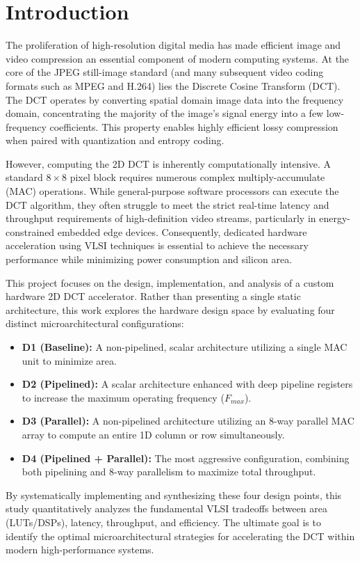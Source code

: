 \section{Introduction}

The proliferation of high-resolution digital media has made efficient image and video compression an essential component of modern computing systems. At the core of the JPEG still-image standard (and many subsequent video coding formats such as MPEG and H.264) lies the Discrete Cosine Transform (DCT). The DCT operates by converting spatial domain image data into the frequency domain, concentrating the majority of the image's signal energy into a few low-frequency coefficients. This property enables highly efficient lossy compression when paired with quantization and entropy coding. 

However, computing the 2D DCT is inherently computationally intensive. A standard $8 \times 8$ pixel block requires numerous complex multiply-accumulate (MAC) operations. While general-purpose software processors can execute the DCT algorithm, they often struggle to meet the strict real-time latency and throughput requirements of high-definition video streams, particularly in energy-constrained embedded edge devices. Consequently, dedicated hardware acceleration using VLSI techniques is essential to achieve the necessary performance while minimizing power consumption and silicon area.

This project focuses on the design, implementation, and analysis of a custom hardware 2D DCT accelerator. Rather than presenting a single static architecture, this work explores the hardware design space by evaluating four distinct microarchitectural configurations:
\begin{itemize}
    \item \textbf{D1 (Baseline):} A non-pipelined, scalar architecture utilizing a single MAC unit to minimize area.
    \item \textbf{D2 (Pipelined):} A scalar architecture enhanced with deep pipeline registers to increase the maximum operating frequency ($F_{max}$).
    \item \textbf{D3 (Parallel):} A non-pipelined architecture utilizing an 8-way parallel MAC array to compute an entire 1D column or row simultaneously.
    \item \textbf{D4 (Pipelined + Parallel):} The most aggressive configuration, combining both pipelining and 8-way parallelism to maximize total throughput.
\end{itemize}

By systematically implementing and synthesizing these four design points, this study quantitatively analyzes the fundamental VLSI tradeoffs between area (LUTs/DSPs), latency, throughput, and efficiency. The ultimate goal is to identify the optimal microarchitectural strategies for accelerating the DCT within modern high-performance systems.

